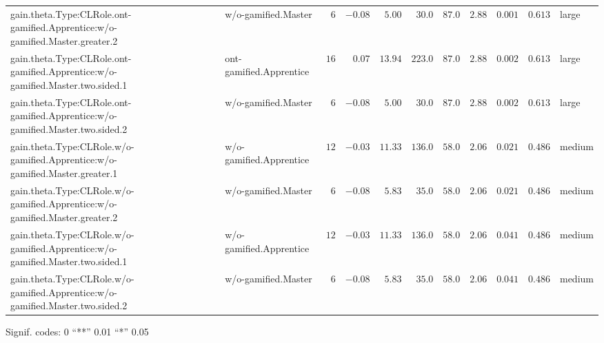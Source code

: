 \documentclass[6pt]{article}
\begin{document}
\begin{landscape}
{\begin{longtable}{llrrrrrrrrl}
gain.theta.Type:CLRole.ont-gamified.Apprentice:w/o-gamified.Master.greater.2&w/o-gamified.Master&$ 6$&$-0.08$&$ 5.00$&$ 30.0$&$ 87.0$&$2.88$&$0.001$&$0.613$&large\tabularnewline
gain.theta.Type:CLRole.ont-gamified.Apprentice:w/o-gamified.Master.two.sided.1&ont-gamified.Apprentice&$16$&$ 0.07$&$13.94$&$223.0$&$ 87.0$&$2.88$&$0.002$&$0.613$&large\tabularnewline
gain.theta.Type:CLRole.ont-gamified.Apprentice:w/o-gamified.Master.two.sided.2&w/o-gamified.Master&$ 6$&$-0.08$&$ 5.00$&$ 30.0$&$ 87.0$&$2.88$&$0.002$&$0.613$&large\tabularnewline
gain.theta.Type:CLRole.w/o-gamified.Apprentice:w/o-gamified.Master.greater.1&w/o-gamified.Apprentice&$12$&$-0.03$&$11.33$&$136.0$&$ 58.0$&$2.06$&$0.021$&$0.486$&medium\tabularnewline
gain.theta.Type:CLRole.w/o-gamified.Apprentice:w/o-gamified.Master.greater.2&w/o-gamified.Master&$ 6$&$-0.08$&$ 5.83$&$ 35.0$&$ 58.0$&$2.06$&$0.021$&$0.486$&medium\tabularnewline
gain.theta.Type:CLRole.w/o-gamified.Apprentice:w/o-gamified.Master.two.sided.1&w/o-gamified.Apprentice&$12$&$-0.03$&$11.33$&$136.0$&$ 58.0$&$2.06$&$0.041$&$0.486$&medium\tabularnewline
gain.theta.Type:CLRole.w/o-gamified.Apprentice:w/o-gamified.Master.two.sided.2&w/o-gamified.Master&$ 6$&$-0.08$&$ 5.83$&$ 35.0$&$ 58.0$&$2.06$&$0.041$&$0.486$&medium\tabularnewline
\hline
\end{longtable}}\end{landscape}
\begin{flushright}{ \tiny{ Signif. codes:  0 ``**'' 0.01 ``*'' 0.05 }}\end{flushright} 
\end{document}
